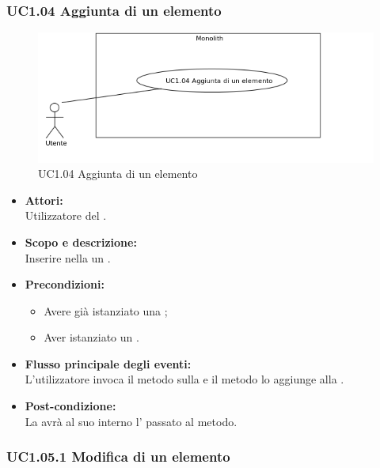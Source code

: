 \subsubsection{UC1.04 Aggiunta di un elemento} \label{UC1.04}

\begin{figure}[H]
	\centering
	\includegraphics[width=15cm]{../../documenti/AnalisiDeiRequisiti/Diagrammi_img/uc1_04.png}
	\caption{UC1.04 Aggiunta di un elemento}
\end{figure}

\begin{itemize}
	\item \textbf{Attori:}
	\\Utilizzatore del .
	\item \textbf{Scopo e descrizione:} 
	\\Inserire nella  un .
	\item \textbf{Precondizioni:}
	\begin{itemize}
		\item Avere già istanziato una ;
		\item Aver istanziato un .
	\end{itemize}
	\item \textbf{Flusso principale degli eventi:}
	\\L'utilizzatore invoca il metodo sulla  e il metodo lo aggiunge alla .
	\item \textbf{Post-condizione:}
	\\La {} avrà al suo interno l' passato al metodo.
\end{itemize}

\subsubsection{UC1.05.1 Modifica di un elemento} \label{UC1.05.1}

